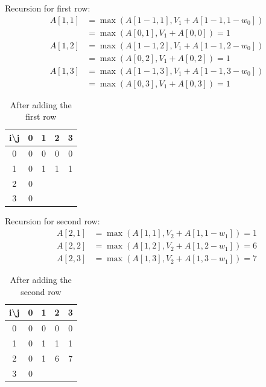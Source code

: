 \documentclass[a4paper,11pt]{book}
\begin{document}
\noindent Recursion for first row:
\begin{align*}
    A[1,1] &= \max(A[1-1,1], V_1 + A[1-1,1-w_0])\\
           &= \max(A[0,1], V_1 + A[0,0]) = 1 \\
    A[1,2] &= \max(A[1-1,2], V_1 + A[1-1,2-w_0])\\
           &= \max(A[0,2], V_1 + A[0,2]) = 1 \\
    A[1,3] &= \max(A[1-1,3], V_1 + A[1-1,3-w_0])\\
           &= \max(A[0,3], V_1 + A[0,3]) = 1
\end{align*}

\begin{table}[ht]
\centering
\begin{tabular}{|c|c|c|c|c|}
\hline
i\textbackslash{}j & 0 & 1 & 2 & 3 \\ \hline
0                  & 0 & 0 & 0 & 0 \\ \hline
1                  & 0 & 1 & 1 & 1 \\ \hline
2                  & 0 &   &   &   \\ \hline
3                  & 0 &   &   &   \\ \hline
\end{tabular}
\caption{After adding the first row}
\end{table}

\noindent Recursion for second row:
\begin{align*}
    A[2,1] &= \max(A[1,1], V_2 + A[1,1-w_1]) = 1\\
    A[2,2] &= \max(A[1,2], V_2 + A[1,2-w_1]) = 6\\
    A[2,3] &= \max(A[1,3], V_2 + A[1,3-w_1]) = 7
\end{align*}

\begin{table}[ht]
\centering
\begin{tabular}{|c|c|c|c|c|}
\hline
i\textbackslash{}j & 0 & 1 & 2 & 3 \\ \hline
0                  & 0 & 0 & 0 & 0 \\ \hline
1                  & 0 & 1 & 1 & 1 \\ \hline
2                  & 0 & 1 & 6 & 7 \\ \hline
3                  & 0 &   &   &   \\ \hline
\end{tabular}
\caption{After adding the second row}
\end{table}
\end{document}
